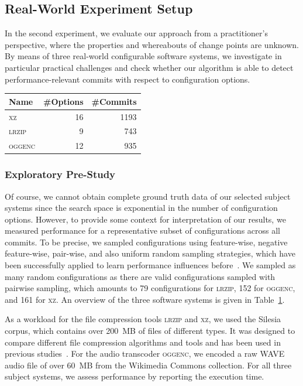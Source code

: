 \documentclass[sigconf]{acmart}
\begin{document}
	\subsection{Real-World Experiment Setup}
	In the second experiment, we evaluate our approach from a practitioner's perspective, where the properties and whereabouts of change points are unknown.  By means of three real-world configurable software systems, we investigate in particular practical challenges and check whether our algorithm is able to detect performance-relevant commits with respect to configuration options. 
	
	\begin{table}
		\centering
		\label{tab:properties}
		\begin{tabular}{lrr}
			\toprule
			\textbf{Name} & \textbf{\#Options} & \textbf{\#Commits}\\
			\midrule
			\textsc{xz} & 16 & 1193\\
			\textsc{lrzip} & 9 & 743 \\
			\textsc{oggenc} & 12 & 935\\
			\bottomrule
		\end{tabular}
	\end{table}
	
	\subsubsection{Exploratory Pre-Study}
	Of course, we cannot obtain complete ground truth data of our selected subject systems since the search space is exponential in the number of configuration options. 
	However, to provide some context for interpretation of our results, we measured performance for a representative subset of configurations across all commits. To be precise, we sampled configurations using feature-wise, negative feature-wise, pair-wise, and also uniform random sampling strategies, which have been successfully applied to learn performance influences before~\cite{alves_sampling_2020}. We sampled as many random configurations as there are valid configurations sampled with pairwise sampling, which amounts to 79 configurations for \textsc{lrzip}, 152 for \textsc{oggenc}, and 161 for \textsc{xz}. An overview of the three software systems is given in Table~\ref{tab:properties}.
	
	As a workload for the file compression tools \textsc{lrzip} and \textsc{xz}, we used the Silesia corpus, which contains over 200~MB of files of different types. It was designed to compare different file compression algorithms and tools and has been used in previous studies~\cite{muhlbauer_accurate_2019}. For the audio transcoder \textsc{oggenc}, we encoded a raw WAVE audio file of over 60~MB from the Wikimedia Commons collection. For all three subject systems, we assess performance by reporting the execution time.
	
\end{document}
